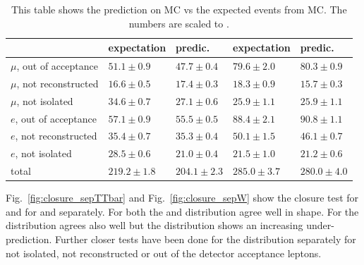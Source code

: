 \begin{table}[htb]
\begin{center}
    \begin{tabular}{|l|ll|ll|}
        \hline
        ~    				& \ttbar expectation   & \ttbar predic.    & \wpj expectation       & \wpj predic.    \\ \hline %
        $\mu$, out of acceptance  	& $51.1\pm 0.9$ & $47.7\pm 0.4$    & $79.6\pm 2.0$ & $80.3\pm 0.9$ \\ \hline %
        $\mu$, not reconstructed  	& $16.6\pm 0.5$ & $17.4\pm 0.3$    & $18.3\pm 0.9$ & $15.7\pm 0.3$ \\ \hline  %
        $\mu$, not isolated 		& $34.6\pm 0.7$ & $27.1\pm 0.6$    & $25.9\pm 1.1$ & $25.9\pm 1.1$ \\ \hline \hline%
        $e$, out of acceptance		& $57.1\pm 0.9$ & $55.5\pm 0.5$    & $88.4\pm 2.1$ & $90.8\pm 1.1$ \\ \hline%
       	$e$, not reconstructed 		& $35.4\pm 0.7$ & $35.3\pm 0.4$    & $50.1\pm 1.5$ & $46.1\pm 0.7$ \\ \hline%
        $e$, not isolated		& $28.5\pm 0.6$ & $21.0\pm 0.4$    & $21.5\pm 1.0$ & $21.2\pm 0.6$ \\ \hline \hline %
	total				& $219.2\pm 1.8$ & $204.1\pm 2.3$  & $285.0\pm 3.7$ & $280.0\pm 4.0$ \\ %
        \hline
    \end{tabular}
\caption{This table shows the prediction on MC vs the expected events from MC. The numbers are scaled to \lumi.\label{tab:mc_closureA}}
\end{center}
\end{table}
Fig.~\ref{fig:closure_sepTTbar} and Fig.~\ref{fig:closure_sepW} show the closure test for \HT and \MHT for \ttbar and \wpj separately. For \wpj both the \MHT and \HT distribution agree well in shape. For \ttbar the \HT distribution agrees also well but the \MHT distribution shows an increasing under-prediction. Further closer tests have been done for the \ttbar \MHT distribution separately for not isolated, not reconstructed or out of the detector acceptance leptons.\\ %
